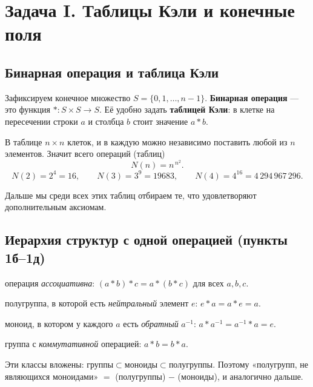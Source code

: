 \documentclass[11pt]{article}
\begin{document}
\section{Задача I. Таблицы Кэли и конечные поля}

\subsection{Бинарная операция и таблица Кэли}

Зафиксируем конечное множество $S=\{0,1,\dots,n-1\}$. \textbf{Бинарная операция} — это
функция $*\colon S\times S\to S$. Её удобно задать \textbf{таблицей Кэли}: в клетке на
пересечении строки $a$ и столбца $b$ стоит значение $a*b$.

\begin{idea}
В таблице $n\times n$ клеток, и в каждую можно независимо поставить любой из $n$
элементов. Значит всего операций (таблиц)
\[
  N(n)=n^{\,n^{2}}.
\]
\[
  N(2)=2^{4}=16,\qquad N(3)=3^{9}=19683,\qquad N(4)=4^{16}=4\,294\,967\,296.
\]
\end{idea}

Дальше мы среди всех этих таблиц отбираем те, что удовлетворяют дополнительным аксиомам.

\subsection{Иерархия структур с одной операцией (пункты 1б–1д)}

\begin{description}[leftmargin=2.2em, style=nextline]
  \item[Полугруппа] операция \emph{ассоциативна}: $(a*b)*c=a*(b*c)$ для всех $a,b,c$.
  \item[Моноид] полугруппа, в которой есть \emph{нейтральный} элемент $e$:
        $e*a=a*e=a$.
  \item[Группа] моноид, в котором у каждого $a$ есть \emph{обратный} $a^{-1}$:
        $a*a^{-1}=a^{-1}*a=e$.
  \item[Абелева группа] группа с \emph{коммутативной} операцией: $a*b=b*a$.
\end{description}

Эти классы вложены: $\text{группы}\subset\text{моноиды}\subset\text{полугруппы}$. Поэтому
«полугрупп, не являющихся моноидами» $=$ (полугруппы) $-$ (моноиды), и аналогично дальше.
\end{document}

